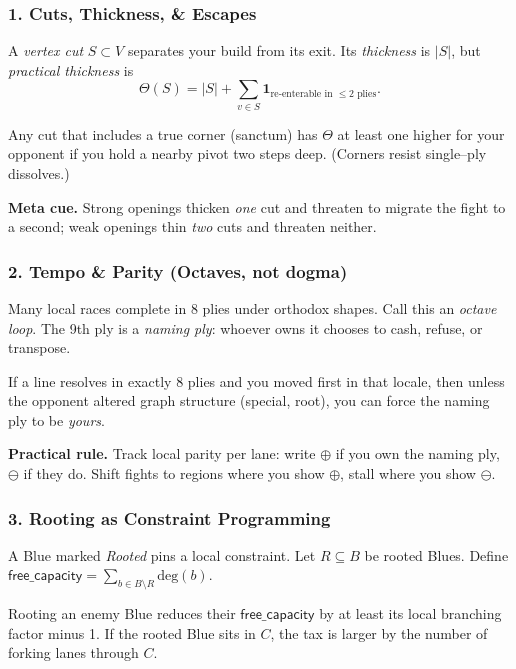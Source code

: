 \documentclass[11pt]{article}
\begin{document}
\begin{itemize}
\subsubsection{1. Cuts, Thickness, \& Escapes}
\label{ael-core:cuts}
A \emph{vertex cut} \(S\subset V\) separates your build from its exit. Its \emph{thickness} is \(|S|\), but \emph{practical thickness} is 
\[
\Theta(S)= |S| + \sum_{v\in S}\mathbf{1}_{\text{re-enterable in }\le 2\text{ plies}}.
\]
\begin{lemma}
Any cut that includes a true corner (sanctum) has \(\Theta\) at least one higher for your opponent if you hold a nearby pivot two steps deep. (Corners resist single–ply dissolves.)
\end{lemma}

\noindent\textbf{Meta cue.} Strong openings thicken \emph{one} cut and threaten to migrate the fight to a second; weak openings thin \emph{two} cuts and threaten neither.

\subsubsection{2. Tempo \& Parity (Octaves, not dogma)}
\label{ael-core:parity}
Many local races complete in \(8\) plies under orthodox shapes. Call this an \emph{octave loop}. The 9th ply is a \emph{naming ply}: whoever owns it chooses to cash, refuse, or transpose.

\begin{proposition}
If a line resolves in exactly \(8\) plies and you moved first in that locale, then unless the opponent altered graph structure (special, root), you can force the naming ply to be \emph{yours}. 
\end{proposition}

\noindent\textbf{Practical rule.} Track local parity per lane: write \(\oplus\) if you own the naming ply, \(\ominus\) if they do. Shift fights to regions where you show \(\oplus\), stall where you show \(\ominus\).

\subsubsection{3. Rooting as Constraint Programming}
\label{ael-core:root}
A Blue marked \emph{Rooted} pins a local constraint. Let \(R\subseteq B\) be rooted Blues. Define \(\mathsf{free\_capacity} = \sum_{b\in B\setminus R}\text{deg}(b)\). 

\begin{lemma}
Rooting an enemy Blue reduces their \(\mathsf{free\_capacity}\) by at least its local branching factor minus 1. If the rooted Blue sits in \(C\), the tax is larger by the number of forking lanes through \(C\).
\end{lemma}


\end{itemize}
\end{document}
